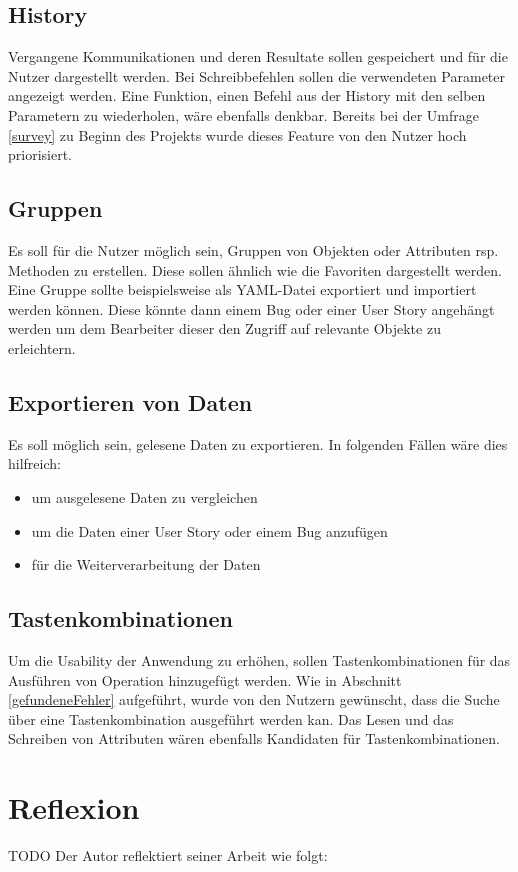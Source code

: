 \subsection{History}
Vergangene Kommunikationen und deren Resultate sollen gespeichert und für die Nutzer dargestellt werden.
Bei Schreibbefehlen sollen die verwendeten Parameter angezeigt werden.
Eine Funktion, einen Befehl aus der History mit den selben Parametern zu wiederholen, wäre ebenfalls denkbar.
Bereits bei der Umfrage \ref{survey} zu Beginn des Projekts wurde dieses Feature von den Nutzer hoch priorisiert.

\subsection{Gruppen}
Es soll für die Nutzer möglich sein, Gruppen von Objekten oder Attributen rsp. Methoden zu erstellen.
Diese sollen ähnlich wie die Favoriten dargestellt werden.
Eine Gruppe sollte beispielsweise als \ac{YAML}-Datei exportiert und importiert werden können.
Diese könnte dann einem Bug oder einer User Story angehängt werden um dem Bearbeiter dieser den Zugriff auf relevante Objekte zu erleichtern.

\subsection{Exportieren von Daten}
Es soll möglich sein, gelesene Daten zu exportieren.
In folgenden Fällen wäre dies hilfreich:
\begin{itemize}
   \item um ausgelesene Daten zu vergleichen
   \item um die Daten einer User Story oder einem Bug anzufügen
   \item für die Weiterverarbeitung der Daten
\end{itemize}

\subsection{Tastenkombinationen}
Um die Usability der Anwendung zu erhöhen, sollen Tastenkombinationen für das Ausführen von Operation hinzugefügt werden.
Wie in Abschnitt \ref{gefundeneFehler} aufgeführt, wurde von den Nutzern gewünscht, dass die Suche über eine Tastenkombination ausgeführt werden kan.
Das Lesen und das Schreiben von Attributen wären ebenfalls Kandidaten für Tastenkombinationen.


\section{Reflexion}
TODO
Der Autor reflektiert seiner Arbeit wie folgt:

